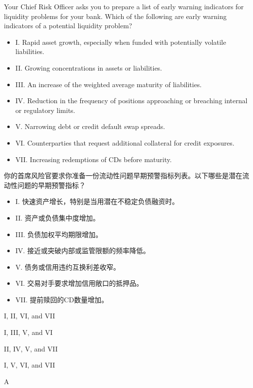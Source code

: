 \documentclass{article}
\newcounter{question} %
\begin{document}
\begin{question}
    Your Chief Risk Officer asks you to prepare a list of early warning indicators for liquidity problems for your bank. Which of the following are early warning indicators of a potential liquidity problem?
    \begin{itemize}
    \item I. Rapid asset growth, especially when funded with potentially volatile liabilities.
    \item II. Growing concentrations in assets or liabilities.
    \item III. An increase of the weighted average maturity of liabilities.
    \item IV. Reduction in the frequency of positions approaching or breaching internal or regulatory limits.
    \item V. Narrowing debt or credit default swap spreads.
    \item VI. Counterparties that request additional collateral for credit exposures.
    \item VII. Increasing redemptions of CDs before maturity.
    \end{itemize}
    你的首席风险官要求你准备一份流动性问题早期预警指标列表。以下哪些是潜在流动性问题的早期预警指标？
    \begin{itemize}
        \item I. 快速资产增长，特别是当用潜在不稳定负债融资时。
        \item II. 资产或负债集中度增加。
        \item III. 负债加权平均期限增加。
        \item IV. 接近或突破内部或监管限额的频率降低。
        \item V. 债务或信用违约互换利差收窄。
        \item VI. 交易对手要求增加信用敞口的抵押品。
        \item VII. 提前赎回的CD数量增加。
    \end{itemize}
\end{question}

\begin{choices}
    \item I, II, VI, and VII
    \item I, III, V, and VI
    \item II, IV, V, and VII
    \item I, V, VI, and VII
\end{choices}

\begin{correctanswer}
    A
\end{correctanswer}
\end{document}
